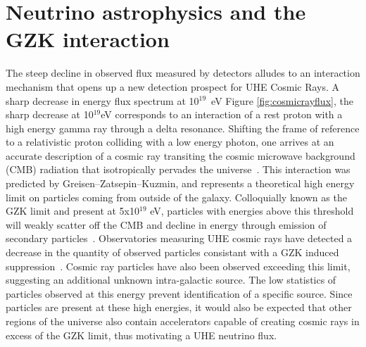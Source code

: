 \section{Neutrino astrophysics and the GZK interaction}
		The steep decline in observed flux measured by detectors alludes to an interaction mechanism that opens up a new detection prospect for UHE Cosmic Rays.  A sharp decrease in energy flux spectrum at 10$^{19}$~eV Figure \ref{fig:cosmicrayflux}, the sharp decrease at 10$^{19}$eV corresponds to an interaction of a rest proton with a high energy gamma ray through a delta resonance.  Shifting the frame of reference to a relativistic proton colliding with a low energy photon, one arrives at an accurate description of a cosmic ray transiting the cosmic microwave background (CMB) radiation that isotropically pervades the universe~\cite{WMAPCMBResults}.  This interaction was predicted by Greisen–Zatsepin–Kuzmin, and represents a theoretical high energy limit on particles coming from outside of the galaxy.  Colloquially known as the GZK limit and present at 5x10$^{19}$ eV, particles with energies above this threshold will weakly scatter off the CMB and decline in energy through emission of secondary particles~\cite{GZK}.  Observatories measuring UHE cosmic rays have detected a decrease in the quantity of observed particles consistant with a GZK induced suppression~\cite{GZKMeasurement}. Cosmic ray particles have also been observed exceeding this limit, suggesting an additional unknown intra-galactic source.  The low statistics of particles observed at this energy prevent identification of a specific source.  Since particles are present at these high energies, it would also be expected that other regions of the universe also contain accelerators capable of creating cosmic rays in excess of the GZK limit, thus motivating a UHE neutrino flux.
		
